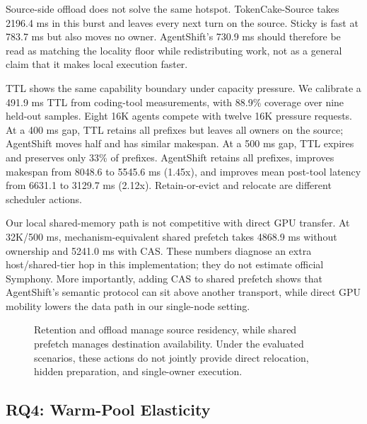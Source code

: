 Source-side offload does not solve the same hotspot. TokenCake-Source takes 2196.4 ms in this burst and leaves every next turn on the source. Sticky is fast at 783.7 ms but also moves no owner. AgentShift's 730.9 ms should therefore be read as matching the locality floor while redistributing work, not as a general claim that it makes local execution faster.

TTL shows the same capability boundary under capacity pressure. We calibrate a 491.9 ms TTL from coding-tool measurements, with 88.9\% coverage over nine held-out samples. Eight 16K agents compete with twelve 16K pressure requests. At a 400 ms gap, TTL retains all prefixes but leaves all owners on the source; AgentShift moves half and has similar makespan. At a 500 ms gap, TTL expires and preserves only 33\% of prefixes. AgentShift retains all prefixes, improves makespan from 8048.6 to 5545.6 ms (1.45x), and improves mean post-tool latency from 6631.1 to 3129.7 ms (2.12x). Retain-or-evict and relocate are different scheduler actions.

Our local shared-memory path is not competitive with direct GPU transfer. At 32K/500 ms, mechanism-equivalent shared prefetch takes 4868.9 ms without ownership and 5241.0 ms with CAS. These numbers diagnose an extra host/shared-tier hop in this implementation; they do not estimate official Symphony. More importantly, adding CAS to shared prefetch shows that AgentShift's semantic protocol can sit above another transport, while direct GPU mobility lowers the data path in our single-node setting.

\begin{figure}[t]
  \centering
  \caption{Retention and offload manage source residency, while shared prefetch manages destination availability. Under the evaluated scenarios, these actions do not jointly provide direct relocation, hidden preparation, and single-owner execution.}
  \label{fig:alternatives}
\end{figure}

\subsection{RQ4: Warm-Pool Elasticity}\label{rq4-warm-pool-elasticity}

